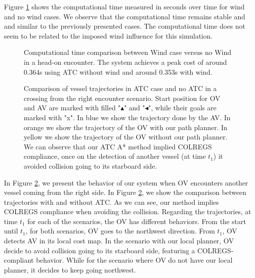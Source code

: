         Figure \ref{fig:plot_ho_w_vs_wind_CT} shows the computational time measured in seconds over time for wind and no wind cases. We observe that the computational time remains stable and and similar to the previously presented cases. The computational time does not seem to be related to the imposed wind influence for this simulation.
        \begin{figure}[H]
            \centering
            
            \caption{Computational time comparison between Wind case versus no Wind in a head-on encounter. The system achieves a peak cost of around 0.364s using \ac{ATC} without wind and around 0.353s with wind.}
            \label{fig:plot_ho_w_vs_wind_CT}
        \end{figure}
        
        
        \begin{figure}[H]
            \centering
            
            \caption{Comparison of vessel trajectories in \ac{ATC} case and no \ac{ATC} in a crossing from the right encounter scenario. Start position for \ac{OV} and \ac{AV} are marked with filled "$\blacktriangle$" and "$\blacktriangleleft$", while their goals are marked with "x". In blue we show the trajectory done by the \ac{AV}. In orange we show the trajectory of the \ac{OV} with our path planner. In yellow we show the trajectory of the \ac{OV} without our path planner. We can observe that our \ac{ATC} A* method implied \ac{COLREGS} compliance, once on the detection of another vessel (at time $t_1$) it avoided collision going to its starboard side.}
            \label{fig:plot_cr_w_vs_wo}
        \end{figure}
        
        In Figure \ref{fig:plot_cr_w_vs_wo}, we present the behavior of our system when \ac{OV} encounters another vessel coming from the right side. In Figure \ref{fig:plot_cr_w_vs_wo}, we show the comparison between trajectories with and without \ac{ATC}. As we can see, our method implies \ac{COLREGS} compliance when avoiding the collision. Regarding the trajectories, at time $t_1$ for each of the scenarios, the \ac{OV} has different behaviors. From the start until $t_1$, for both scenarios, \ac{OV} goes to the northwest direction. From $t_1$, \ac{OV} detects \ac{AV} in its local cost map. In the scenario with our local planner, \ac{OV} decide to avoid collision going to its starboard side, featuring a \ac{COLREGS}-compliant behavior. While for the scenario where \ac{OV} do not have our local planner, it decides to keep going northwest.
        
